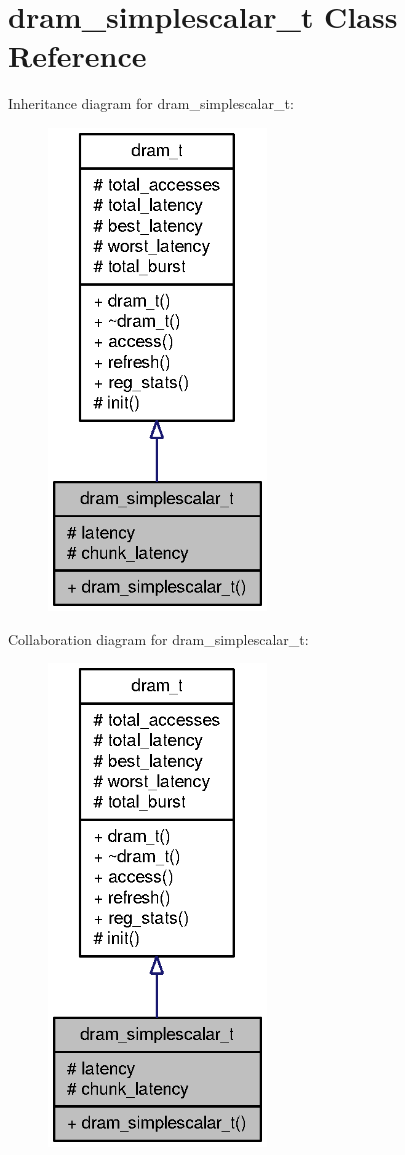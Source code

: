 \section{dram\_\-simplescalar\_\-t Class Reference}
\label{classdram__simplescalar__t}
Inheritance diagram for dram\_\-simplescalar\_\-t:\nopagebreak
\begin{figure}[H]
\begin{center}
\leavevmode
\includegraphics[width=164pt]{classdram__simplescalar__t__inherit__graph}
\end{center}
\end{figure}
Collaboration diagram for dram\_\-simplescalar\_\-t:\nopagebreak
\begin{figure}[H]
\begin{center}
\leavevmode
\includegraphics[width=164pt]{classdram__simplescalar__t__coll__graph}
\end{center}
\end{figure}
